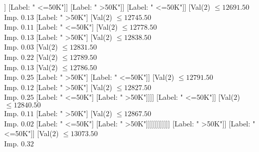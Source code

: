 \documentclass[margin=10pt]{standalone}
\begin{document}
\begin{forest}
																																					[Val($2$) $ \leq 12545.50$ \\ Imp. $0.17$
																																						[Label: " <=50K"]
																																						[Label: " >50K"]]
																																					[Label: " <=50K"]]
																																				[Label: " >50K"]]
																																			[Label: " <=50K"]]
																																		[Val($2$) $ \leq 12691.50$ \\ Imp. $0.13$
																																			[Label: " >50K"]
																																			[Val($2$) $ \leq 12745.50$ \\ Imp. $0.11$
																																				[Label: " <=50K"]
																																				[Val($2$) $ \leq 12778.50$ \\ Imp. $0.13$
																																					[Label: " >50K"]
																																					[Val($2$) $ \leq 12838.50$ \\ Imp. $0.03$
																																						[Val($2$) $ \leq 12831.50$ \\ Imp. $0.22$
																																							[Val($2$) $ \leq 12789.50$ \\ Imp. $0.13$
																																								[Val($2$) $ \leq 12786.50$ \\ Imp. $0.25$
																																									[Label: " >50K"]
																																									[Label: " <=50K"]]
																																								[Val($2$) $ \leq 12791.50$ \\ Imp. $0.12$
																																									[Label: " >50K"]
																																									[Val($2$) $ \leq 12827.50$ \\ Imp. $0.25$
																																										[Label: " <=50K"]
																																										[Label: " >50K"]]]]
																																							[Label: " <=50K"]]
																																						[Val($2$) $ \leq 12840.50$ \\ Imp. $0.11$
																																							[Label: " >50K"]
																																							[Val($2$) $ \leq 12867.50$ \\ Imp. $0.02$
																																								[Label: " <=50K"]
																																								[Label: " >50K"]]]]]]]]]]]]
																													[Label: " >50K"]]
																												[Label: " <=50K"]]
																											[Val($2$) $ \leq 13073.50$ \\ Imp. $0.32$

\end{forest}
\end{document}
